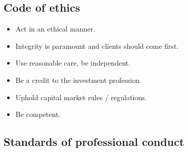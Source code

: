 \documentclass[../notes_compiled.tex]{subfiles}
\begin{document}
\subsection{Code of ethics}
\begin{itemize}
\item Act in an ethical manner.
\item Integrity is paramount and clients should come first.
\item Use reasonable care, be independent.
\item Be a credit to the investment profession.
\item Uphold capital market rules / regulations.
\item Be competent.
\end{itemize}

\subsection{Standards of professional conduct}
\end{document}
